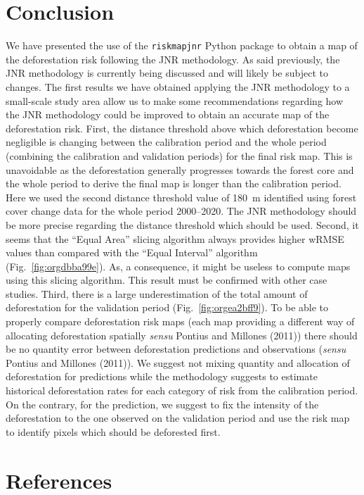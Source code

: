 \documentclass[paper=a4, 12pt, DIV=12]{scrartcl}
\makeatletter
\newcommand{\citeprocitem}[2]{\hyper@linkstart{cite}{citeproc_bib_item_#1}#2\hyper@linkend}
\makeatother
\begin{document}
\section{Conclusion}
\label{sec:org96690fc}

We have presented the use of the \texttt{riskmapjnr} Python package to obtain a map of the deforestation risk following the JNR methodology. As said previously, the JNR methodology is currently being discussed and will likely be subject to changes. The first results we have obtained applying the JNR methodology to a small-scale study area allow us to make some recommendations regarding how the JNR methodology could be improved to obtain an accurate map of the deforestation risk. First, the distance threshold above which deforestation become negligible is changing between the calibration period and the whole period (combining the calibration and validation periods) for the final risk map. This is unavoidable as the deforestation generally progresses towards the forest core and the whole period to derive the final map is longer than the calibration period. Here we used the second distance threshold value of 180 m identified using forest cover change data for the whole period 2000--2020. The JNR methodology should be more precise regarding the distance threshold which should be used. Second, it seems that the ``Equal Area'' slicing algorithm always provides higher wRMSE values than compared with the ``Equal Interval'' algorithm (Fig. \ref{fig:orgdbba99e}). As, a consequence, it might be useless to compute maps using this slicing algorithm. This result must be confirmed with other case studies. Third, there is a large underestimation of the total amount of deforestation for the validation period (Fig. \ref{fig:orgea2bff9}). To be able to properly compare deforestation risk maps (each map providing a different way of allocating deforestation spatially \emph{sensu} Pontius and Millones (\citeprocitem{3}{2011})) there should be no quantity error between deforestation predictions and observations (\emph{sensu} Pontius and Millones (\citeprocitem{3}{2011})). We suggest not mixing quantity and allocation of deforestation for predictions while the methodology suggests to estimate historical deforestation rates for each category of risk from the calibration period. On the contrary, for the prediction, we suggest to fix the intensity of the deforestation to the one observed on the validation period and use the risk map to identify pixels which should be deforested first. 

\section{References}
\label{sec:org9661b99}
\end{document}
